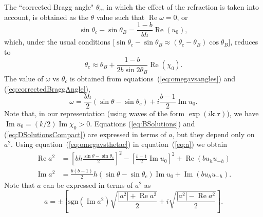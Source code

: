 \documentclass[preprint]{iucr}              %
\begin{document}
The ``corrected Bragg angle" $\theta_c$, in which the effect of the refraction is taken into account, is obtained as the $\theta$ value such that $\operatorname{Re} \omega=0$, or
\begin{equation}\label{eq:correctedBraggAngleExact}
   \sin\theta_c - \sin\theta_B = \frac{1-b}{b h} \operatorname{Re}(u_0),  
\end{equation}
which, under the usual conditions [$\sin\theta_c-\sin\theta_B \approx  (\theta_c-\theta_B) \cos\theta_B$], reduces to
\begin{equation}\label{eq:correctedBraggAngle}
   \theta_c \approx \theta_B + \frac{1-b}{2 b \sin2\theta_B} \operatorname{Re}(\chi_0).  
\end{equation}
The value of $\omega$ vs $\theta_c$ is obtained from equations~(\ref{eq:omegavsangles}) and (\ref{eq:correctedBraggAngle}),
\begin{equation}\label{eq:omegavsthetac}
    \omega=\frac{b h}{2} (\sin\theta-\sin\theta_c) + i \frac{b-1}{2} \operatorname{Im}u_0.
\end{equation}
Note that, in our representation (using waves of the form $\exp(i\textbf{k}.\textbf{r})$), we have $\operatorname{Im}u_0=(k/2)\operatorname{Im}\chi_0>0$.
Equations (\ref{eq:BSolutions}) and (\ref{eq:DSolutionsCompact}) are expressed in terms of $a$, but they depend only on $a^2$. 
Using equation~(\ref{eq:omegavsthetac}) in equation~(\ref{eq:a}) we obtain
\begin{subequations}\label{eq:avsthetac}
\begin{align}
\operatorname{Re}a^2&=\left[ bh
\frac{\sin\theta-\sin\theta_c}{2}
\right]^2 - \left[ \frac{b-1}{2}\operatorname{Im}u_0 \right]^2 + \operatorname{Re}(b u_h u_{-h})  \\
\operatorname{Im}a^2 &= \frac{b(b-1)}{2} h  (\sin\theta-\sin\theta_c) \operatorname{Im}u_0 + \operatorname{Im} (b u_h u_{-h}). 
\end{align}
\end{subequations}
Note that $a$ can be expressed in terms of $a^2$ as
\begin{equation}\label{eq:asigned}
    a = \pm \left[ \text{sgn}(\operatorname{Im}a^2)\sqrt{\frac{|a^2| + \operatorname{Re} a^2}{2}} + i \sqrt{\frac{|a^2|-\operatorname{Re}a^2}{2}} \right].
\end{equation}
\end{document}
